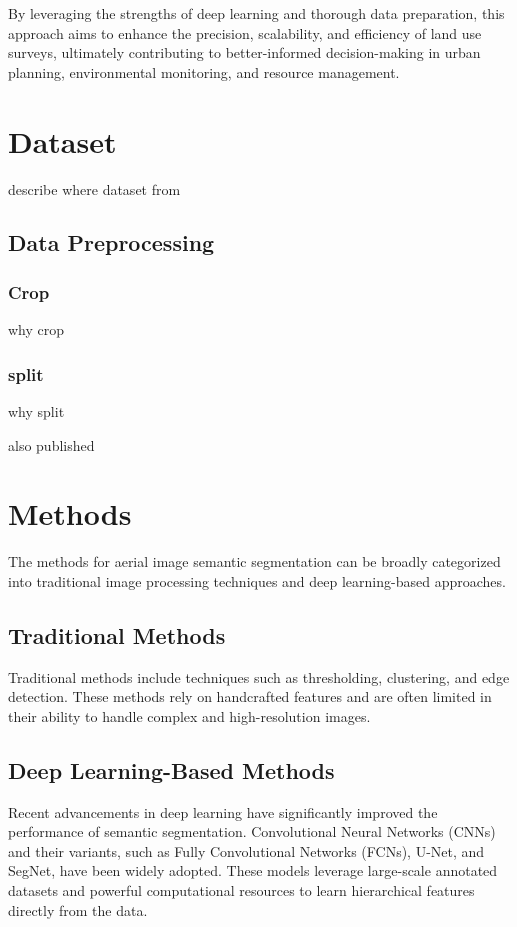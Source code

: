 \documentclass[conference]{IEEEtran}
\begin{document}
By leveraging the strengths of deep learning and thorough data preparation, this approach aims to enhance the precision, scalability, and efficiency of land use surveys, ultimately contributing to better-informed decision-making in urban planning, environmental monitoring, and resource management.



\section{Dataset}
describe where dataset from
\subsection{Data Preprocessing}
\subsubsection{Crop}
why crop
\subsubsection{split}
why split

also published


\section{Methods}
The methods for aerial image semantic segmentation can be broadly categorized into traditional image processing techniques and deep learning-based approaches.

\subsection{Traditional Methods}
Traditional methods include techniques such as thresholding, clustering, and edge detection. These methods rely on handcrafted features and are often limited in their ability to handle complex and high-resolution images.

\subsection{Deep Learning-Based Methods}
Recent advancements in deep learning have significantly improved the performance of semantic segmentation. Convolutional Neural Networks (CNNs) and their variants, such as Fully Convolutional Networks (FCNs), U-Net, and SegNet, have been widely adopted. These models leverage large-scale annotated datasets and powerful computational resources to learn hierarchical features directly from the data.
\end{document}
